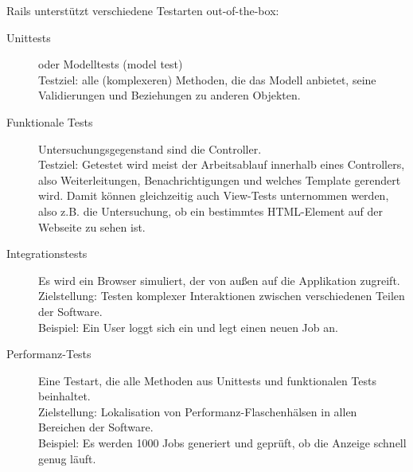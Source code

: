 Rails unterstützt verschiedene Testarten out-of-the-box:
\begin{description}
 \item[Unittests] oder Modelltests (model test)\\
 Testziel: alle (komplexeren) Methoden, die das Modell anbietet, seine Validierungen und Beziehungen zu anderen Objekten.
 \item[Funktionale Tests] Untersuchungsgegenstand sind die Controller. \\
 Testziel: Getestet wird meist der Arbeitsablauf innerhalb eines Controllers, also Weiterleitungen, Benachrichtigungen und welches Template gerendert wird.
 Damit können gleichzeitig auch View-Tests unternommen werden, also z.B. die Untersuchung, ob ein bestimmtes HTML-Element auf der Webseite zu sehen ist.
 \item[Integrationstests] Es wird ein Browser simuliert, der von außen auf die Applikation zugreift.\\
 Zielstellung: Testen komplexer Interaktionen zwischen verschiedenen Teilen der Software.\\
 Beispiel: Ein User loggt sich ein und legt einen neuen Job an.
 \item[Performanz-Tests] Eine Testart, die alle Methoden aus Unittests und funktionalen Tests beinhaltet.\\
 Zielstellung: Lokalisation von Performanz-Flaschenhälsen in allen Bereichen der Software. \\
 Beispiel: Es werden 1000 Jobs generiert und geprüft, ob die Anzeige schnell genug läuft.
\end{description}
